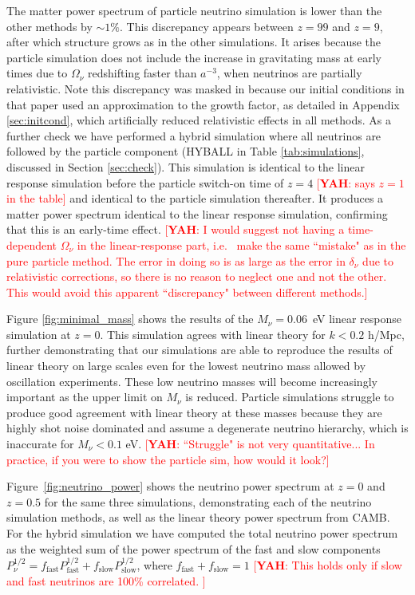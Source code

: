 \documentclass[useAMS, usenatbib]{mnras}
\newcommand{\yah}[1]{{\textcolor{red}{[{\bf YAH}: #1]}}}
\begin{document}
The matter power spectrum of particle neutrino simulation is lower than the other methods by $\sim 1\%$. This discrepancy appears between $z=99$ and $z=9$, after which structure grows as in the other simulations. It arises because the particle simulation does not include the increase in gravitating mass at early times due to $\Omega_\nu$ redshifting faster than $a^{-3}$, when neutrinos are partially relativistic. Note this discrepancy was masked in \cite{AHB} because our initial conditions in that paper used an approximation to the growth factor, as detailed in Appendix \ref{sec:initcond}, which artificially reduced relativistic effects in all methods. As a further check we have performed a hybrid simulation where all neutrinos are followed by the particle component (HYBALL in Table \ref{tab:simulations}, discussed in Section \ref{sec:check}). This simulation is identical to the linear response simulation before the particle switch-on time of $z=4$ \yah{says $z = 1$ in the table} and identical to the particle simulation thereafter. It produces a matter power spectrum identical to the linear response simulation, confirming that this is an early-time effect. \yah{I would suggest not having a time-dependent $\Omega_\nu$ in the linear-response part, i.e.~ make the same ``mistake" as in the pure particle method. The error in doing so is as large as the error in $\delta_\nu$ due to relativistic corrections, so there is no reason to neglect one and not the other. This would avoid this apparent ``discrepancy" between different methods.}

Figure \ref{fig:minimal_mass} shows the results of the $M_\nu = 0.06$~eV linear response simulation at $z=0$. This simulation agrees with linear theory for $k < 0.2$ h/Mpc, further demonstrating that our simulations are able to reproduce the results of linear theory on large scales even for the lowest neutrino mass allowed by oscillation experiments. These low neutrino masses will become increasingly important as the upper limit on $M_\nu$ is reduced. Particle simulations struggle to produce good agreement with linear theory at these masses because they are highly shot noise dominated and assume a degenerate neutrino hierarchy, which is inaccurate for $M_\nu < 0.1$ eV. \yah{``Struggle" is not very quantitative... In practice, if you were to show the particle sim, how would it look?}

Figure~\ref{fig:neutrino_power} shows the neutrino power spectrum at $z=0$ and $z=0.5$ for the same three simulations, demonstrating each of the neutrino simulation methods, as well as the linear theory power spectrum from CAMB. For the hybrid simulation we have computed the total neutrino power spectrum as the weighted sum of the power spectrum of the fast and slow components $P^{1/2}_\nu = f_\mathrm{fast} P^{1/2}_\mathrm{fast} + f_\mathrm{slow} P^{1/2}_\mathrm{slow}$, where $f_\mathrm{fast} + f_\mathrm{slow} = 1$ \yah{This holds only if slow and fast neutrinos are 100\% correlated. } 
\end{document}
